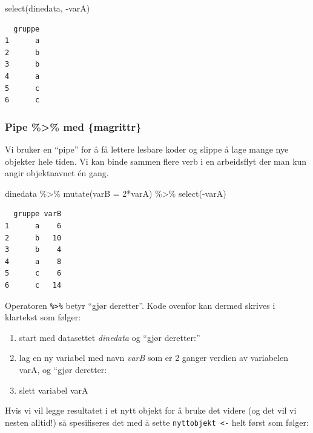 \documentclass[
  letterpaper,
  DIV=11,
  numbers=noendperiod]{scrreprt}
\newenvironment{Shaded}{\begin{snugshade}}{\end{snugshade}}
\newcommand{\AttributeTok}[1]{\textcolor[rgb]{0.40,0.45,0.13}{#1}}
\newcommand{\DecValTok}[1]{\textcolor[rgb]{0.68,0.00,0.00}{#1}}
\newcommand{\FunctionTok}[1]{\textcolor[rgb]{0.28,0.35,0.67}{#1}}
\newcommand{\NormalTok}[1]{\textcolor[rgb]{0.00,0.23,0.31}{#1}}
\newcommand{\SpecialCharTok}[1]{\textcolor[rgb]{0.37,0.37,0.37}{#1}}
\providecommand{\tightlist}{%
  \setlength{\itemsep}{0pt}\setlength{\parskip}{0pt}}\usepackage{longtable,booktabs,array}
\theoremstyle{definition}
\theoremstyle{remark}
\begin{document}
\begin{Shaded}
\begin{Highlighting}[]
\FunctionTok{select}\NormalTok{(dinedata, }\SpecialCharTok{{-}}\NormalTok{varA)}
\end{Highlighting}
\end{Shaded}

\begin{verbatim}
  gruppe
1      a
2      b
3      b
4      a
5      c
6      c
\end{verbatim}

\hypertarget{pipe-med-magrittr}{%
\subsubsection{Pipe \%\textgreater\% med
\{magrittr\}}\label{pipe-med-magrittr}}

Vi bruker en ``pipe'' for å få lettere lesbare koder og slippe å lage
mange nye objekter hele tiden. Vi kan binde sammen flere verb i en
arbeidsflyt der man kun angir objektnavnet én gang.

\begin{Shaded}
\begin{Highlighting}[]
\NormalTok{dinedata }\SpecialCharTok{\%\textgreater{}\%} 
  \FunctionTok{mutate}\NormalTok{(}\AttributeTok{varB =} \DecValTok{2}\SpecialCharTok{*}\NormalTok{varA) }\SpecialCharTok{\%\textgreater{}\%} 
  \FunctionTok{select}\NormalTok{(}\SpecialCharTok{{-}}\NormalTok{varA)}
\end{Highlighting}
\end{Shaded}

\begin{verbatim}
  gruppe varB
1      a    6
2      b   10
3      b    4
4      a    8
5      c    6
6      c   14
\end{verbatim}

Operatoren \texttt{\%\textgreater{}\%} betyr ``gjør deretter''. Kode
ovenfor kan dermed skrives i klartekst som følger:

\begin{enumerate}
\def\labelenumi{\arabic{enumi})}
\tightlist
\item
  start med datasettet \emph{dinedata} og ``gjør deretter:''
\item
  lag en ny variabel med navn \emph{varB} som er 2 ganger verdien av
  variabelen varA, og ``gjør deretter:
\item
  slett variabel varA
\end{enumerate}

Hvis vi vil legge resultatet i et nytt objekt for å bruke det videre (og
det vil vi nesten alltid!) så spesifiseres det med å sette
\texttt{nyttobjekt\ \textless{}-} helt først som følger:
\end{document}
